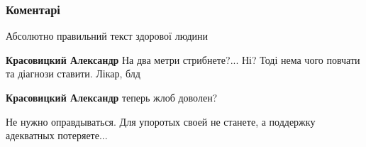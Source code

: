  
 
 
 
 
\subsubsection{Коментарі}
\label{sec:12_08_2021.fb.maguchih_jaroslava.1.vrag_vernost.cmt}

\begin{itemize}
 
Абсолютно правильний текст здорової людини

\begin{itemize}
 
\textbf{Красовицкий Александр} На два метри стрибнете?... Ні? Тоді нема чого повчати та діагнози ставити. Лікар, блд

 
\textbf{Красовицкий Александр} теперь жлоб доволен?
\end{itemize}

 

Не нужно оправдываться. Для упоротых своей не станете, а поддержку адекватных
потеряете...

\begin{itemize}
 

\end{itemize}
\end{itemize}
